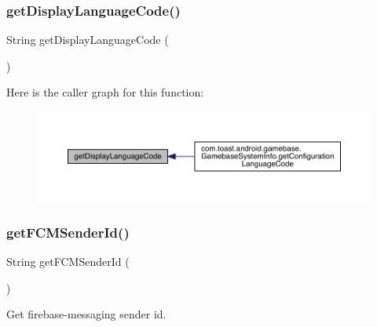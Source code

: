 \subsubsection{\texorpdfstring{get\+Display\+Language\+Code()}{getDisplayLanguageCode()}}
{\footnotesize\ttfamily String get\+Display\+Language\+Code (\begin{DoxyParamCaption}{ }\end{DoxyParamCaption})}

Here is the caller graph for this function\+:
\nopagebreak
\begin{figure}[H]
\begin{center}
\leavevmode
\includegraphics[width=350pt]{classcom_1_1toast_1_1android_1_1gamebase_1_1_gamebase_configuration_a2cbab9a001e124c2ad4b9815db0f3012_icgraph}
\end{center}
\end{figure}
\mbox{\label{classcom_1_1toast_1_1android_1_1gamebase_1_1_gamebase_configuration_a16a632ddb686090e7c21ecdc727414eb}} 
\subsubsection{\texorpdfstring{get\+F\+C\+M\+Sender\+Id()}{getFCMSenderId()}}
{\footnotesize\ttfamily String get\+F\+C\+M\+Sender\+Id (\begin{DoxyParamCaption}{ }\end{DoxyParamCaption})}



Get firebase-\/messaging sender id. 


